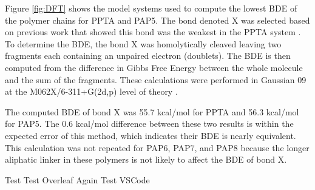 \documentclass[journal=langd5,manuscript=article]{achemso}
\begin{document}
Figure \ref{fig:DFT} shows the model systems used to compute the 
lowest BDE of the polymer chains for PPTA and PAP5.
The bond denoted X was selected based on previous work 
that showed this bond was the weakest in the PPTA system \cite{mercer2017molecular}.
To determine the BDE, the bond X was homolytically cleaved leaving
two fragments each containing an unpaired electron (doublets).
The BDE is then computed from the
difference in Gibbs Free Energy between the whole
molecule and the sum of the fragments.
These calculations were performed in Gaussian 09 \cite{g09}
at the M062X/6-311+G(2d,p) level of theory \cite{zhao_2008,mclean_1980}.

The computed BDE of bond X was 55.7 kcal/mol for PPTA and
56.3 kcal/mol for PAP5.
The 0.6 kcal/mol difference between these two results is
within the expected error of this method, which indicates
their BDE is nearly equivalent.
This calculation was not repeated for PAP6, PAP7, and PAP8 because
the longer aliphatic linker in these polymers is not likely to affect the BDE of bond X.

Test
Test Overleaf Again
Test VSCode
\FloatBarrier

\end{document}
